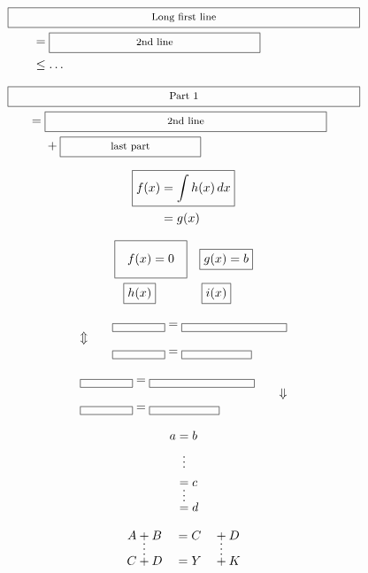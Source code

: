 \documentclass{article}
\begin{document}
\begin{align*}
\MoveEqLeft \Framebox[10cm][c]{Long first line}\\
& = \Framebox[6cm][c]{2nd line}\\
& \leq \dots
\end{align*}

\begin{align*}
\MoveEqLeft[3] \Framebox[10cm][c]{Part 1}\\
= {} & \Framebox[8cm][c]{2nd line}\\
& + \Framebox[4cm][c]{last part}
\end{align*}

\begin{align*}
\Aboxed{ f(x) & = \int h(x)\, dx} \\
& = g(x)
\end{align*}

\begin{align*}
\setlength\fboxsep{1em}
\Aboxed{ f(x) &= 0 } & \Aboxed{ g(x) &= b} \\
\Aboxed{ h(x) } & \Aboxed{ i(x) }
\end{align*}

\begin{alignat}{2}
&& \framebox[1.5cm]{} &= \framebox[3cm]{}\\
\ArrowBetweenLines %
&& \framebox[1.5cm]{} &= \framebox[2cm]{}
\end{alignat}

\begin{alignat*}{2}
\framebox[1.5cm]{} &= \framebox[3cm]{} &&\\
\ArrowBetweenLines*[\Downarrow]
\framebox[1.5cm]{} &= \framebox[2cm]{} &&
\end{alignat*}

\begin{align*}
a &= b \\
& \vdotswithin{=} \\
& = c \\
\shortvdotswithin{=}
& = d
\end{align*}

\begin{alignat*}{3}
A&+ B &&= C &&+ D \\
\MTFlushSpaceAbove
&\vdotswithin{+} &&&& \vdotswithin{+}
\MTFlushSpaceBelow
C &+ D &&= Y &&+K
\end{alignat*}
\end{document}
